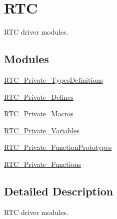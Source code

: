 \hypertarget{group___r_t_c}{\section{R\-T\-C}
\label{group___r_t_c}
}


R\-T\-C driver modules.  


\subsection*{Modules}
\begin{DoxyCompactItemize}
\item 
\hyperlink{group___r_t_c___private___types_definitions}{R\-T\-C\-\_\-\-Private\-\_\-\-Types\-Definitions}
\item 
\hyperlink{group___r_t_c___private___defines}{R\-T\-C\-\_\-\-Private\-\_\-\-Defines}
\item 
\hyperlink{group___r_t_c___private___macros}{R\-T\-C\-\_\-\-Private\-\_\-\-Macros}
\item 
\hyperlink{group___r_t_c___private___variables}{R\-T\-C\-\_\-\-Private\-\_\-\-Variables}
\item 
\hyperlink{group___r_t_c___private___function_prototypes}{R\-T\-C\-\_\-\-Private\-\_\-\-Function\-Prototypes}
\item 
\hyperlink{group___r_t_c___private___functions}{R\-T\-C\-\_\-\-Private\-\_\-\-Functions}
\end{DoxyCompactItemize}


\subsection{Detailed Description}
R\-T\-C driver modules. 